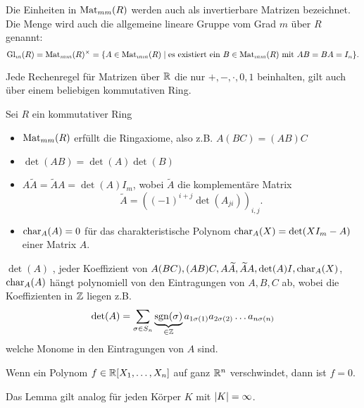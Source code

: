 Die Einheiten in $\operatorname{Mat}_{mm}(R)$ werden auch als invertierbare Matrizen bezeichnet.
Die Menge wird auch die allgemeine lineare Gruppe vom Grad $m$ über $R$ genannt:
\[
	\operatorname{Gl}_{m}(R) = \operatorname{Mat}_{mm}(R)^{\times} = \{A \in \operatorname{Mat}_{mm}(R) \mid \text{es existiert ein } B \in \operatorname{Mat}_{mm}(R) \text{ mit } AB = BA = I_{n}\}   
.\] 


\begin{proposition}[Meta]
	Jede Rechenregel für Matrizen über $\mathbb{R}$ die nur $+,-,\cdot,0,1$ beinhalten, gilt auch über einem beliebigen kommutativen Ring.
\end{proposition}

\begin{proposition}
	Sei $R$ ein kommutativer Ring
	\begin{itemize}
		\item $\operatorname{Mat}_{mm}(R)$ erfüllt die Ringaxiome, also z.B. $A(BC) = (AB)C$
		\item $\det(AB) = \det(A) \det(B)$
		\item  $A \widetilde{A} = \widetilde{A} A = \det(A) I_{m}$, wobei $\widetilde{A}$ die komplementäre Matrix
			\[
				\widetilde{A} = ((-1)^{i+j} \det(A_{ji}))_{i,j}
			.\] 
		\item $\operatorname{char}_{A}(A) = 0$ für das charakteristische Polynom $\operatorname{char}_{A}(X) = \det(X I_{m} - A)$ einer Matrix $A$.
	\end{itemize}
\end{proposition}

\begin{remark}
	$\det(A)$ , jeder Koeffizient von $A(BC), (AB)C, A  \widetilde{A}, \widetilde{A} A, \det(A) I, \operatorname{char}_{A}(X)$, $ \operatorname{char}_{A}(A)$ 
	hängt polynomiell von den Eintragungen von $A,B,C$ ab, wobei die Koeffizienten in $\mathbb{Z}$ liegen z.B.
	\[
		\det(A) = \sum_{\sigma \in S_{n}} \underbrace{\operatorname{sgn}(\sigma)}_{\in \mathbb{Z}}
			a_{1 \sigma(1)} a_{2 \sigma(2)} \ldots a_{n \sigma(n)}
		\]
		welche Monome in den Eintragungen von $A$ sind.
\end{remark}

\begin{lemma}
	Wenn ein Polynom $f \in \mathbb{R}[X_1,\ldots,X_{n}]$ auf ganz $\mathbb{R}^{n}$ verschwindet, dann ist $f=0$.
\end{lemma}


\begin{remark}
	Das Lemma gilt analog für jeden Körper $K$ mit $\abs{K} = \infty$.
\end{remark}






















